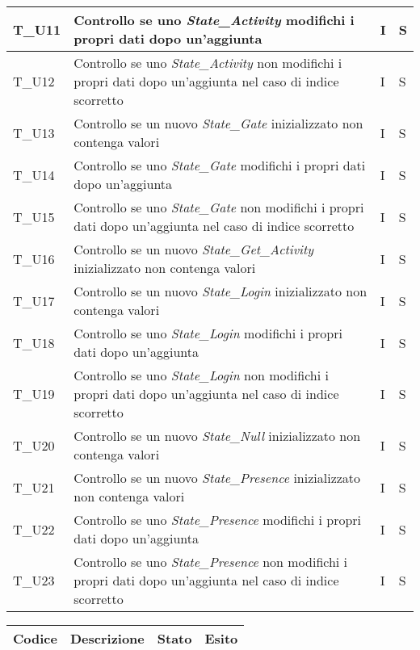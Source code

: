 \begin{center}
\begin{tabular}{ |m{3em}|m{23em}|m{3em}|m{3em}| }
      T\_U11 & Controllo se uno \textit{State\_Activity} modifichi i propri dati dopo un'aggiunta  & I & S \\
      \hline
      T\_U12 & Controllo se uno \textit{State\_Activity} non modifichi i propri dati dopo un'aggiunta nel caso di indice scorretto  & I & S \\
      \hline
      T\_U13 &  Controllo se un nuovo \textit{State\_Gate} inizializzato non contenga valori  & I & S\\
      \hline
      T\_U14 &  Controllo se uno \textit{State\_Gate} modifichi i propri dati dopo un'aggiunta  & I & S \\
      \hline
      T\_U15 & Controllo se uno \textit{State\_Gate} non modifichi i propri dati dopo un'aggiunta nel caso di indice scorretto  & I & S \\
      \hline
      T\_U16 &  Controllo se un nuovo \textit{State\_Get\_Activity} inizializzato non contenga valori & I & S \\
      \hline
      T\_U17 & Controllo se un nuovo \textit{State\_Login} inizializzato non contenga valori  & I & S\\
      \hline
      T\_U18 & Controllo se uno \textit{State\_Login} modifichi i propri dati dopo un'aggiunta  & I & S \\
      \hline
      T\_U19 & Controllo se uno \textit{State\_Login} non modifichi i propri dati dopo un'aggiunta nel caso di indice scorretto  & I & S \\
      \hline
      T\_U20 & Controllo se un nuovo \textit{State\_Null} inizializzato non contenga valori  & I & S\\
      \hline
      T\_U21 & Controllo se un nuovo \textit{State\_Presence} inizializzato non contenga valori & I & S\\
      \hline
      T\_U22 & Controllo se uno \textit{State\_Presence} modifichi i propri dati dopo un'aggiunta  & I & S \\
      \hline
      T\_U23 & Controllo se uno \textit{State\_Presence} non modifichi i propri dati dopo un'aggiunta nel caso di indice scorretto   & I & S\\
      \hline
    \end{tabular}
    \newpage
    \begin{tabular}{ |m{3em}|m{23em}|m{3em}|m{3em}| }
      \hline
      \textbf{Codice} & \textbf{Descrizione}  & \textbf{Stato} & \textbf{Esito}\\
      \hline

\end{tabular}
\end{center}
